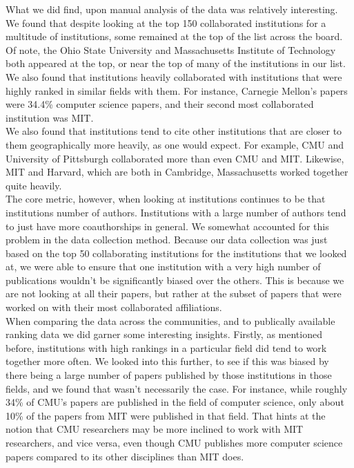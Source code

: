 \documentclass[times, 10pt,twocolumn]{article}
\begin{document}
What we did find, upon manual analysis of the data was relatively interesting. We found that despite looking at the top 150 collaborated institutions for a multitude of institutions, some remained at the top of the list across the board. Of note, the Ohio State University and Massachusetts Institute of Technology both appeared at the top, or near the top of many of the institutions in our list. We also found that institutions heavily collaborated with institutions that were highly ranked in similar fields with them. For instance, Carnegie Mellon’s papers were 34.4\% computer science papers, and their second most collaborated institution was MIT. \\

We also found that institutions tend to cite other institutions that are closer to them geographically more heavily, as one would expect. For example, CMU and University of Pittsburgh collaborated more than even CMU and MIT. Likewise, MIT and Harvard, which are both in Cambridge, Massachusetts worked together quite heavily. \\

The core metric, however, when looking at institutions continues to be that institutions number of authors. Institutions with a large number of authors tend to just have more coauthorships in general.  We somewhat accounted for this problem in the data collection method. Because our data collection was just based on the top 50 collaborating institutions for the institutions that we looked at, we were able to ensure that one institution with a very high number of publications wouldn’t be significantly biased over the others. This is because we are not looking at all their papers, but rather at the subset of papers that were worked on with their most collaborated affiliations. \\

When comparing the data across the communities, and to publically available ranking data we did garner some interesting insights. Firstly, as mentioned before, institutions with high rankings in a particular field did tend to work together more often. We looked into this further, to see if this was biased by there being a large number of papers published by those institutions in those fields, and we found that wasn’t necessarily the case. For instance, while roughly 34\% of CMU’s papers are published in the field of computer science, only about 10\% of the papers from MIT were published in that field. That hints at the notion that CMU researchers may be more inclined to work with MIT researchers, and vice versa, even though CMU publishes more computer science papers compared to its other disciplines than MIT does. \\
\end{document}
